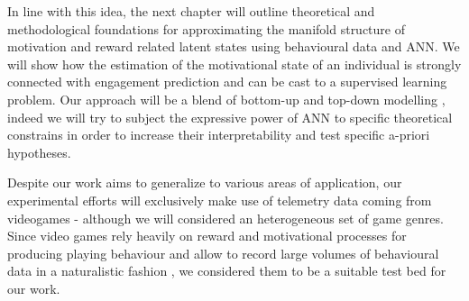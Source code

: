 In line with this idea, the next chapter will outline theoretical and methodological foundations for approximating the manifold structure of motivation and reward related latent states using behavioural data and ANN.  We will show how the estimation of the motivational state of an individual is strongly connected with engagement prediction and can be cast to a supervised learning problem. Our approach will be a blend of bottom-up and top-down modelling \cite{yannakakis2013player}, indeed we will try to subject the expressive power of ANN to specific theoretical constrains in order to increase their interpretability and test specific a-priori hypotheses. 

Despite our work aims to generalize to various areas of application, our experimental efforts will exclusively make use of telemetry data coming from videogames - although we will considered an heterogeneous set of game genres. Since video games rely heavily on reward and motivational processes for producing playing behaviour  \cite{chumbley2006affect,wang2011game,phillips2013videogame,avserivskis2017computational, agarwal2017quitting, steyvers2019joint} and allow to record large volumes of behavioural data in a naturalistic fashion \cite{drachen2015behavioral}, we considered them to be a suitable test bed for our work.
